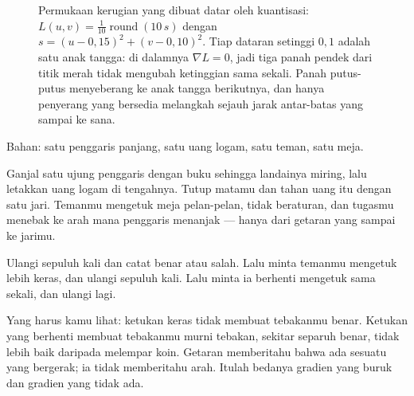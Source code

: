 \begin{figure}[!htbp]
\centering
{}
\caption{Permukaan kerugian yang dibuat datar oleh kuantisasi:
$L(u,v)=\frac{1}{10}\operatorname{round}(10\,s)$ dengan
$s=(u-0{,}15)^2+(v-0{,}10)^2$.
Tiap dataran setinggi $0{,}1$ adalah satu anak tangga: di dalamnya $\nabla L=0$,
jadi tiga panah pendek dari titik merah tidak mengubah ketinggian sama sekali.
Panah putus-putus menyeberang ke anak tangga berikutnya, dan hanya penyerang yang
bersedia melangkah sejauh jarak antar-batas yang sampai ke sana.}
\label{fig:permukaan}
\end{figure}

\begin{tangan}
Bahan: satu penggaris panjang, satu uang logam, satu teman, satu meja.

Ganjal satu ujung penggaris dengan buku sehingga landainya miring, lalu letakkan uang
logam di tengahnya. Tutup matamu dan tahan uang itu dengan satu jari. Temanmu mengetuk
meja pelan-pelan, tidak beraturan, dan tugasmu menebak ke arah mana penggaris menanjak
--- hanya dari getaran yang sampai ke jarimu.

Ulangi sepuluh kali dan catat benar atau salah. Lalu minta temanmu mengetuk lebih keras,
dan ulangi sepuluh kali. Lalu minta ia berhenti mengetuk sama sekali, dan ulangi lagi.

Yang harus kamu lihat: ketukan keras tidak membuat tebakanmu benar. Ketukan yang berhenti
membuat tebakanmu murni tebakan, sekitar separuh benar, tidak lebih baik daripada melempar
koin. Getaran memberitahu bahwa ada sesuatu yang bergerak; ia tidak memberitahu arah.
Itulah bedanya gradien yang buruk dan gradien yang tidak ada.
\end{tangan}

